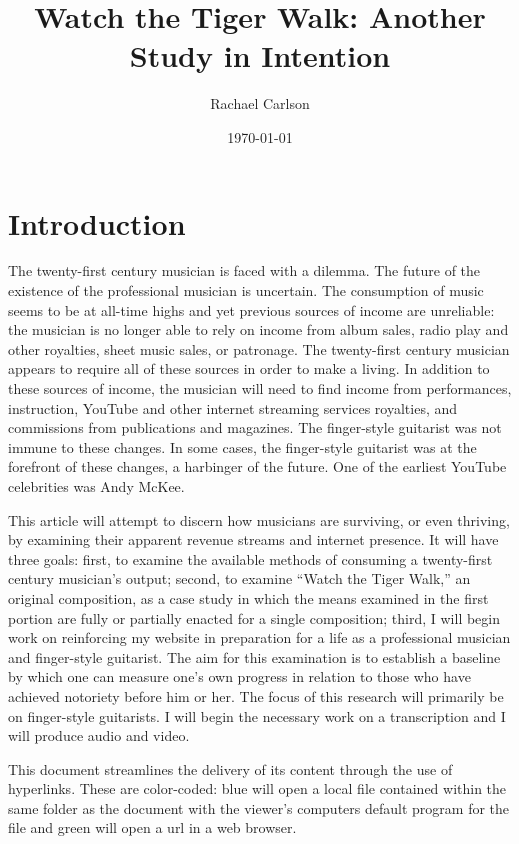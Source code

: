 \documentclass[unicode,hyperfootnotes=false,xetex,colorlinks=true,nofonts,nobib]{tufte-handout}
\title{Watch the Tiger Walk: Another Study in Intention}
\author{Rachael Carlson}
\date{\today}
\begin{document}
\maketitle{}
\section{Introduction}
The twenty-first century musician is faced with a dilemma. The future of the existence of the professional musician is uncertain. The consumption of music seems to be at all-time highs and yet previous sources of income are unreliable: the musician is no longer able to rely on income from album sales, radio play and other royalties, sheet music sales, or patronage. The twenty-first century musician appears to require all of these sources in order to make a living. In addition to these sources of income, the musician will need to find income from performances, instruction, YouTube and other internet streaming services royalties, and commissions from publications and magazines. The finger-style guitarist was not immune to these changes. In some cases, the finger-style guitarist was at the forefront of these changes, a harbinger of the future. One of the earliest YouTube celebrities was Andy McKee.

This article will attempt to discern how musicians are surviving, or even thriving, by examining their apparent revenue streams and internet presence. It will have three goals: first, to examine the available methods of consuming a twenty-first century musician's output; second, to examine ``Watch the Tiger Walk,'' an original composition, as a case study in which the means examined in the first portion are fully or partially enacted for a single composition; third, I will begin work on reinforcing my website in preparation for a life as a professional musician and finger-style guitarist. The aim for this examination is to establish a baseline by which one can measure one's own progress in relation to those who have achieved notoriety before him or her. The focus of this research will primarily be on finger-style guitarists. I will begin the necessary work on a transcription and I will produce audio and video.  

This document streamlines the delivery of its content through the use of hyperlinks. These are color-coded: blue will open a local file contained within the same folder as the document with the viewer's computers default program for the file and green will open a url in a web browser.
\end{document}
